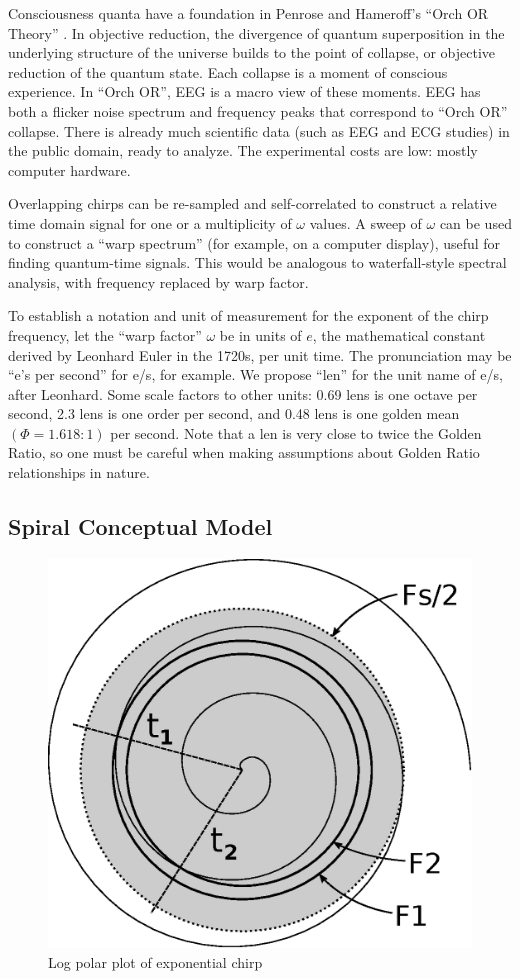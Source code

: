 Consciousness quanta have a foundation in Penrose and Hameroff's
``Orch OR Theory'' \cite{Hameroff}.
In objective reduction, the divergence of quantum superposition in the
underlying structure of the universe builds to the point of collapse,
or objective reduction of the quantum state.
Each collapse is a moment of conscious experience.
In ``Orch OR'', EEG is a macro view of these moments.
EEG has both a flicker noise spectrum and frequency peaks that correspond
to ``Orch OR'' collapse.
There is already much scientific data (such as EEG and ECG studies) in the
public domain, ready to analyze.
The experimental costs are low: mostly computer hardware.

Overlapping chirps can be re-sampled and self-correlated to construct a relative
time domain signal for one or a multiplicity of $\omega$ values.
A sweep of $\omega$ can be used to construct a ``warp spectrum'' (for example,
on a computer display), useful for finding quantum-time signals.
This would be analogous to waterfall-style spectral analysis, with frequency
replaced by warp factor.

To establish a notation and unit of measurement for the exponent of the chirp
frequency, let the ``warp factor'' $\omega$ be in units of $e$, the
mathematical constant derived by Leonhard Euler in the 1720s, per unit time.
The pronunciation may be ``e's per second'' for e/s, for example.
We propose ``len'' for the unit name of e/s, after Leonhard.
Some scale factors to other units: 0.69 lens is one octave per second,
2.3 lens is one order per second, and 0.48 lens is one golden mean
$(\Phi=1.618:1)$ per second.
Note that a len is very close to twice the Golden Ratio,
so one must be careful when making assumptions about Golden Ratio relationships
in nature.

\subsection{Spiral Conceptual Model}

\begin{figure}[h]
	\centering
	\includegraphics[width=0.7\linewidth]{../source/spiral_e}
	\caption[Quantum to Relative Time Relation]{Log polar plot of exponential chirp}
	\label{fig:spiral}
\end{figure}

